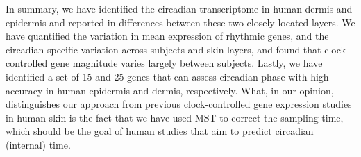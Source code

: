 \normalsize
In summary, we have identified the circadian transcriptome in human dermis and epidermis and reported in differences between these two closely located layers. We have quantified the variation in mean expression of rhythmic genes, and the circadian-specific variation across subjects and skin layers, and found that clock-controlled gene magnitude varies largely between subjects. Lastly, we have identified a set of 15 and 25 genes that can assess circadian phase with high accuracy in human epidermis and dermis, respectively. What, in our opinion, distinguishes our approach from previous clock-controlled gene expression studies in human skin is the fact that we have used MST to correct the sampling time, which should be the goal of human studies that aim to predict circadian (internal) time. 

